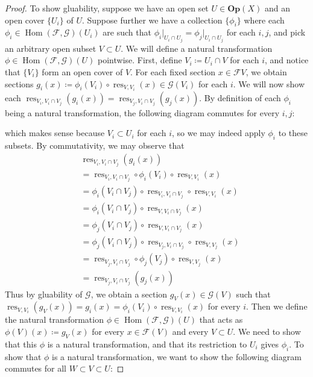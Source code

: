 \documentclass{article}
\newcommand{\fF}{\mathscr{F}}
\newcommand{\fG}{\mathscr{G}}
\newcommand{\Op}{\mathbf{Op}} %
\DeclareMathOperator{\res}{\mathrm{res}}
\DeclareMathOperator{\Hom}{\mathrm{Hom}}
\begin{document}
\begin{proof}
    \indent To show gluability, suppose we have an open set $U\in \Op(X)$ and an open cover $\{U_i\}$ of $U$. Suppose further we have a collection $\{\phi_i\}$ where each $\phi_i\in \Hom(\fF,\fG)(U_i)$ are such that $\phi_i\vert_{U_i \cap U_j}=\phi_j\vert_{U_i\cap U_j}$ for each $i,j$, and pick an arbitrary open subset $V\subset U$. We will define a natural transformation $\phi\in \Hom(\fF,\fG)(U)$ pointwise. First, define $V_i\coloneqq U_i \cap V$ for each $i$, and notice that $\{V_i\}$ form an open cover of $V$. For each fixed section $x\in \fF V$, we obtain sections $g_i(x)\coloneqq \phi_i(V_i)\circ \res_{V,V_i}(x)\in \fG(V_i)$ for each $i$. We will now show each $\res_{V_i,V_i\cap V_j}(g_i(x))=\res_{V_j,V_i\cap V_j}(g_j(x))$. By definition of each $\phi_i$ being a natural transformation, the following diagram commutes for every $i,j$:
    \begin{center}
    \end{center}
    which makes sense because $V_i\subset U_i$ for each $i$, so we may indeed apply $\phi_i$ to these subsets. By commutativity, we may observe that
    \begin{align*}
        &\res_{V_i,V_i\cap V_j}(g_i(x))\\
        &=\res_{V_i,V_i\cap V_j}\circ \phi_i(V_i)\circ \res_{V,V_i}(x)\\
        &=\phi_i(V_i\cap V_j)\circ \res_{V_i,V_i\cap V_j}\circ \res_{V,V_i}(x)\\
        &=\phi_i(V_i\cap V_j)\circ \res_{V,V_i\cap V_j}(x)\\
        &=\phi_j(V_i\cap V_j)\circ \res_{V,V_i\cap V_j}(x)\\
        &=\phi_j(V_i\cap V_j)\circ \res_{V_j, V_i\cap V_j}\circ \res_{V,V_j}(x)\\
        &=\res_{V_j,V_i\cap V_j}\circ \phi_j(V_j)\circ \res_{V,V_j}(x)\\
        &=\res_{V_j,V_i \cap V_j}(g_j(x))
    \end{align*}
    Thus by gluability of $\fG$, we obtain a section $g_V(x)\in \fG(V)$ such that $\res_{V,V_i}(g_V(x))=g_i(x)=\phi_i(V_i)\circ \res_{V,V_i}(x)$ for every $i$. Then we define the natural transformation $\phi\in \Hom(\fF,\fG)(U)$ that acts as $\phi(V)(x)\coloneqq g_V(x)$ for every $x\in \fF(V)$ and every $V\subset U$. We need to show that this $\phi$ is a natural transformation, and that its restriction to $U_i$ gives $\phi_i$. To show that $\phi$ is a natural transformation, we want to show the following diagram commutes for all $W\subset V\subset U$:

\end{proof}
\end{document}
